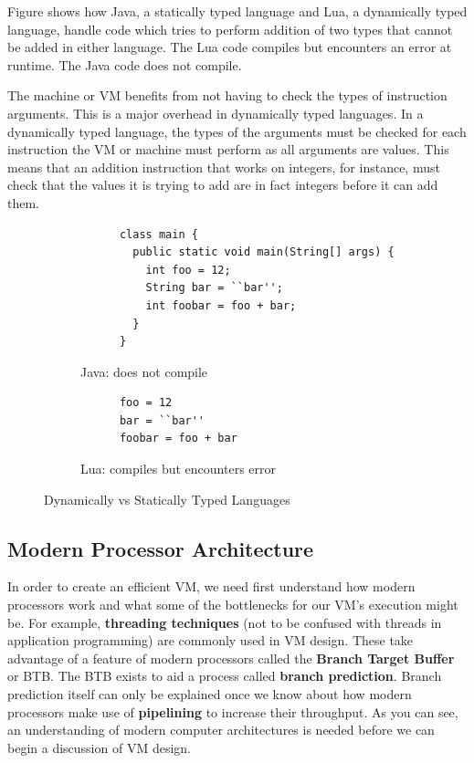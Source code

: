 \documentclass[english,a4paper]{article}
\begin{document}
Figure \pageref{fig:dvs} shows how Java, a statically typed language
and Lua, a dynamically typed language, handle code which tries to
perform addition of two types that cannot be added in either
language. The Lua code compiles but encounters an error at
runtime. The Java code does not compile.

The machine or VM benefits from not having to check the types of
instruction arguments. This is a major overhead in dynamically typed
languages. In a dynamically typed language,
the types of the arguments must be checked for each instruction the VM
or machine must perform as all arguments are values. This means that
an addition instruction that works on integers, for instance, must
check that the values it is trying to add are in fact integers before
it can add them.

\begin{figure}
  \begin{subfigure}{.48\textwidth}
    \begin{lstlisting}
      class main {
        public static void main(String[] args) {
          int foo = 12;
          String bar = ``bar'';
          int foobar = foo + bar;
        }
      }
    \end{lstlisting}
    \caption{Java: does not compile}
  \end{subfigure}
  \begin{subfigure}{.48\textwidth}
    \begin{lstlisting}
      foo = 12
      bar = ``bar''
      foobar = foo + bar
    \end{lstlisting}
    \caption{Lua: compiles but encounters error}
  \end{subfigure}
  \caption{Dynamically vs Statically Typed Languages}
  \label{fig:dvs}
\end{figure}


\subsection{Modern Processor Architecture}

In order to create an efficient VM, we need first understand how
modern processors work and what some of the bottlenecks for our VM's
execution might be. For example, \textbf{threading techniques} (not to
be confused with threads in application programming) are commonly used
in VM design. These take advantage of a feature of modern processors
called the \textbf{Branch Target Buffer} or BTB. The BTB exists to aid a
process called \textbf{branch prediction}. Branch prediction itself can
only be explained once we know about how modern processors make use of
\textbf{pipelining} to increase their throughput. As you can see, an
understanding of modern computer architectures is needed before we can
begin a discussion of VM design.
\end{document}

